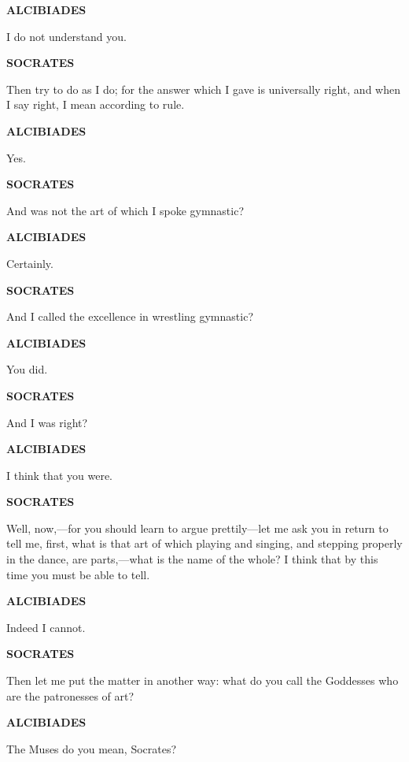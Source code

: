 \documentclass[11pt,letter]{article}
\begin{document}
\par \textbf{ALCIBIADES}
\par   I do not understand you.

\par \textbf{SOCRATES}
\par   Then try to do as I do; for the answer which I gave is universally right, and when I say right, I mean according to rule.

\par \textbf{ALCIBIADES}
\par   Yes.

\par \textbf{SOCRATES}
\par   And was not the art of which I spoke gymnastic?

\par \textbf{ALCIBIADES}
\par   Certainly.

\par \textbf{SOCRATES}
\par   And I called the excellence in wrestling gymnastic?

\par \textbf{ALCIBIADES}
\par   You did.

\par \textbf{SOCRATES}
\par   And I was right?

\par \textbf{ALCIBIADES}
\par   I think that you were.

\par \textbf{SOCRATES}
\par   Well, now,—for you should learn to argue prettily—let me ask you in return to tell me, first, what is that art of which playing and singing, and stepping properly in the dance, are parts,—what is the name of the whole? I think that by this time you must be able to tell.

\par \textbf{ALCIBIADES}
\par   Indeed I cannot.

\par \textbf{SOCRATES}
\par   Then let me put the matter in another way:  what do you call the Goddesses who are the patronesses of art?

\par \textbf{ALCIBIADES}
\par   The Muses do you mean, Socrates?
\end{document}
